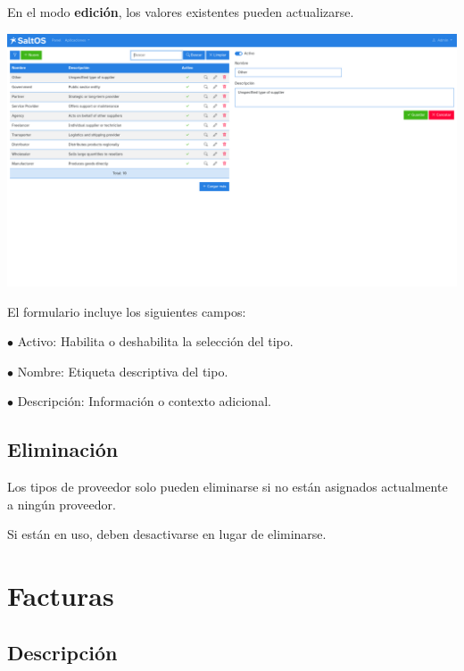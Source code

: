 \documentclass[a4paper]{article}
\begin{document}
En el modo \textbf{edición}, los valores existentes pueden actualizarse.

\begin{center}\includegraphics[width=1\textwidth]{../ujest/snaps/test-screenshots-js-screenshots-purchases-suppliers-types-edit-10-es-es-1-snap.png}\end{center}

El formulario incluye los siguientes campos:

\begin{compactitem}
\item[\color{myblue}$\bullet$] Activo: Habilita o deshabilita la selección del tipo.
\item[\color{myblue}$\bullet$] Nombre: Etiqueta descriptiva del tipo.
\item[\color{myblue}$\bullet$] Descripción: Información o contexto adicional.
\end{compactitem}

\hypertarget{toc135}{}
\subsection{Eliminación}

Los tipos de proveedor solo pueden eliminarse si no están asignados actualmente a ningún proveedor.

Si están en uso, deben desactivarse en lugar de eliminarse.


\hypertarget{toc136}{}
\section{Facturas}

\hypertarget{toc137}{}
\subsection{Descripción}
\end{document}
